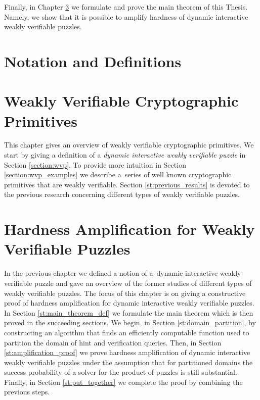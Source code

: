 \documentclass[11pt,a4paper,titlepage]{memoir}
\begin{document}
Finally, in Chapter \ref{ch:main_result} we formulate and prove the main theorem of this Thesis.
Namely, we show that it is possible to amplify hardness of dynamic interactive weakly verifiable puzzles.
%
\chapter{Notation and Definitions}
\label{ch:preliminaries}


\chapter{Weakly Verifiable Cryptographic Primitives}
\label{ch:intro_weakly}
This chapter gives an overview of weakly verifiable cryptographic primitives.
We start by giving a definition of a \textit{dynamic interactive weakly verifiable puzzle} in Section \ref{section:wvp}.
To provide more intuition in Section \ref{section:wvp_examples} we describe a~series of well known cryptographic primitives
that are weakly verifiable. Section \ref{st:previous_results} is devoted to the previous research concerning different types of weakly verifiable puzzles.
%



%
%
\chapter{Hardness Amplification for Weakly Verifiable Puzzles}
\label{ch:main_result}
In the previous chapter we defined a notion of a~dynamic interactive weakly verifiable puzzle
and gave an overview of the former studies of different types of weakly verifiable puzzles.
The focus of this chapter is on giving a constructive proof of hardness amplification for dynamic interactive weakly verifiable puzzles.
In Section \ref{st:main_theorem_def} we formulate the main theorem which is then proved in the succeeding sections.
We begin, in Section \ref{st:domain_partition}, by constructing an algorithm that finds an efficiently computable function used
to partition the domain of hint and verification queries. Then, in Section \ref{st:amplification_proof} we prove
hardness amplification of dynamic interactive weakly verifiable puzzles under the assumption that for partitioned domains
the success probability of a solver for the product of puzzles is still substantial.
Finally, in Section \ref{st:put_together} we complete the proof by combining the previous steps.
%

%

%

%

%
\end{document}
